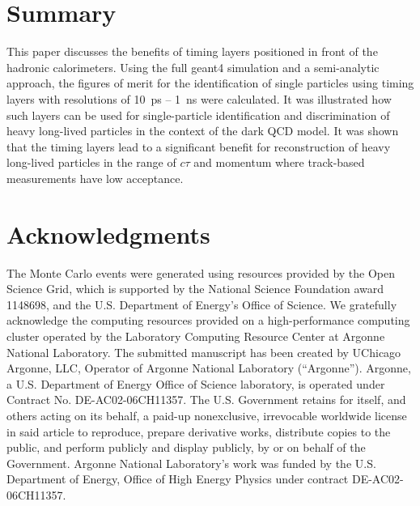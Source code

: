 \documentclass[final,1p,11pt]{elsarticle}
\begin{document}
\clearpage 





%

%


\section{Summary}

This paper discusses the benefits of timing layers positioned in front of the hadronic calorimeters.
Using the full {\sc geant}4 simulation and a semi-analytic approach,
the figures of merit for the identification of single particles
using timing layers with resolutions of 10~ps -- 1~ns were calculated.
It was illustrated 
how such layers can be used for single-particle identification and
discrimination of heavy long-lived particles in the context of the dark QCD model.
It was shown that the timing layers lead to a significant benefit for reconstruction of heavy long-lived particles 
in the range of $c\tau$ and momentum where track-based measurements have low acceptance.


\section*{Acknowledgments}
The Monte Carlo events were generated using resources provided by the Open Science Grid, 
which is supported by the National Science Foundation award 1148698, and the U.S. 
Department of Energy's Office of Science.
We gratefully acknowledge the computing resources provided on a
high-performance computing cluster operated by the
Laboratory Computing Resource Center at Argonne National Laboratory.
The submitted manuscript has been created by UChicago Argonne, LLC,
Operator of Argonne National Laboratory (“Argonne”). Argonne, a U.S.
Department of Energy Office of Science laboratory, is operated under
Contract No. DE-AC02-06CH11357. The U.S. Government retains for itself,
and others acting on its behalf, a paid-up nonexclusive, irrevocable
worldwide license in said article to reproduce, prepare derivative works,
distribute copies to the public, and perform publicly and display
publicly, by or on behalf of the Government.
Argonne National Laboratory’s work was
funded by the U.S. Department of Energy, Office of High Energy Physics
under contract DE-AC02-06CH11357.
\end{document}
